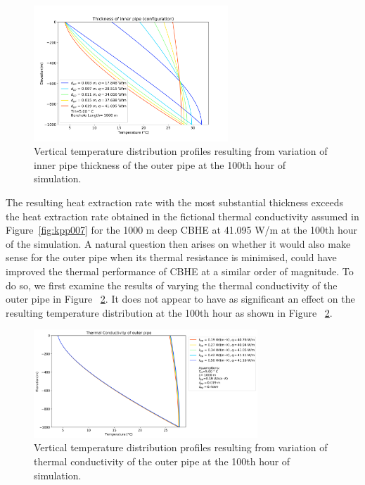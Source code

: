         \begin{figure}[h!]
            \centering
            \includegraphics[width=0.65\textwidth]{dpp_500_MIN.png}
            \caption{Vertical temperature distribution profiles resulting from variation of inner pipe thickness of the outer pipe at the 100th hour of simulation.}
            \label{fig:thickness}
        \end{figure}
        
		The resulting heat extraction rate with the most substantial thickness exceeds the heat extraction rate obtained in the fictional thermal conductivity assumed in Figure~\ref{fig:kpp007} for the 1000 m deep CBHE at 41.095 W/m at the 100th hour of the simulation. A natural question then arises on whether it would also make sense for the outer pipe when its thermal resistance is minimised, could have improved the thermal performance of CBHE at a similar order of magnitude. To do so, we first examine the results of varying the thermal conductivity of the outer pipe in Figure ~\ref{fig:kep}. It does not appear to have as significant an effect on the resulting temperature distribution at the 100th hour as shown in Figure ~\ref{fig:kep}.
        
        \begin{figure}[h!]
            \centering
            \includegraphics[width=0.75\textwidth]{kep_1000_MIN.png}
            \caption{Vertical temperature distribution profiles resulting from variation of thermal conductivity of the outer pipe at the 100th hour of simulation.}
            \label{fig:kep}
        \end{figure}
        
